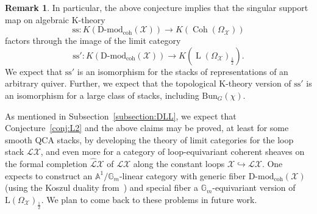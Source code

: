 \documentclass [11pt,oneside,a4paper,mathscr]{amsart}
\theoremstyle{definition}
\newtheorem{remark}[thm]{Remark}
\newcommand{\LL}{\operatorname{L}}
\newcommand{\X}{\mathcal{X}}
\newcommand{\Coh}{\operatorname{Coh}}
\newcommand{\Bun}{\mathrm{Bun}}
\begin{document}
\begin{remark}\label{rem:singularsupport}
    In particular, the above conjecture implies that the singular support map on algebraic K-theory
    \[\text{ss}\colon K(\mathrm{D}\text{-}\mathrm{mod}_{\mathrm{coh}}(\X))\to K\left(\Coh(\Omega_\X)\right)\] factors through the image of the limit category
    \[\text{ss}'\colon K(\mathrm{D}\text{-}\mathrm{mod}_{\mathrm{coh}}(\X))\to K\left(\LL(\Omega_{\X})_{\frac{1}{2}}\right).\]
    We expect that $\text{ss}'$ is an isomorphism for the stacks of representations of an arbitrary quiver. Further, we expect that the topological K-theory version of $\text{ss}'$ is an isomorphism for a large class of stacks, including $\Bun_G(\chi)$. 
    
    As mentioned in Subsection~\ref{subsection:DLL}, we expect that Conjecture~\ref{conj:L2} and the above claims may be proved, at least for some smooth QCA stacks, by developing the theory of limit categories for the loop stack $\mathcal{L}\X$, and even more for a category of loop-equivariant coherent sheaves on the formal completion $\hat{\mathcal{L}}\X$ of $\mathcal{L}\X$ along the constant loops $\X\hookrightarrow\mathscr{L}\X$. One expects to construct an $\mathbb{A}^1/\mathbb{G}_m$-linear category with generic fiber $\text{D-mod}_{\mathrm{coh}}(\X)$ (using the Koszul duality from~\cite{HChen}) and special fiber a $\mathbb{G}_m$-equivariant version of $\text{L}(\Omega_{\X})_{\frac{1}{2}}$. 
    We plan to come back to these problems in future work.  
\end{remark}
\end{document}
